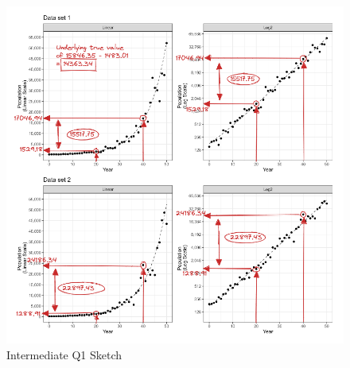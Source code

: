 \documentclass[print]{nuthesis}
\begin{document}
\begin{figure}[tbp]

{\centering \includegraphics[width=1\linewidth,]{images/03-estimation/qi1-sketch} 

}

\caption{Intermediate Q1 Sketch}\label{fig:qi1-sketch}
\end{figure}
\end{document}
